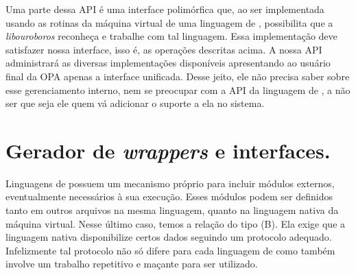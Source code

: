 



    Uma parte dessa API é uma interface polimórfica que, ao ser implementada usando
    as rotinas da máquina virtual de uma linguagem de \script{}, possibilita que
    a \emph{libouroboros} reconheça e trabalhe com tal linguagem. Essa
    implementação deve satisfazer nossa interface, isso é, as operações
    descritas acima. A nossa API administrará as diversas implementações
    disponíveis apresentando ao usuário final da OPA apenas a interface
    unificada. Desse jeito, ele não precisa saber sobre esse gerenciamento
    interno, nem se preocupar com a API da linguagem de \script{}, a não ser que
    seja ele quem vá adicionar o suporte a ela no sistema.
    
  
  
  \section{Gerador de \emph{wrappers} e interfaces.}
  \label{sec:estrutura:opwig}


    Linguagens de \script{} possuem um mecanismo próprio para incluir módulos
    externos, eventualmente necessários à sua execução. Esses módulos podem ser
    definidos tanto em outros arquivos na mesma linguagem, quanto na linguagem
    nativa da máquina virtual. Nesse último caso, temos a relação do tipo (B). Ela
    exige que a linguagem nativa disponibilize certos dados seguindo um protocolo
    adequado. Infelizmente tal protocolo não só difere para cada linguagem de
    \script{} como também involve um trabalho repetitivo e maçante para ser utilizado. 


